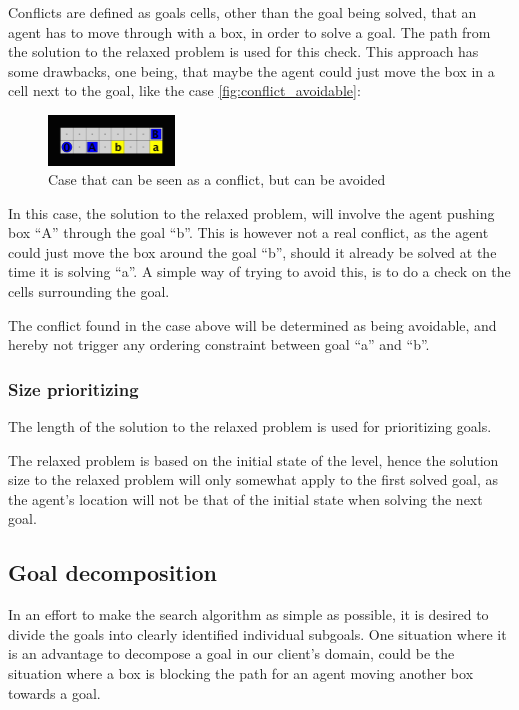 \documentclass[Main]{subfiles}
\begin{document}
Conflicts are defined as goals cells, other than the goal being solved, that an
agent has to move through with a box, in order to solve a goal. The path from
the solution to the relaxed problem is used for this check. This approach has
some drawbacks, one being, that maybe the agent could just move the box in a
cell next to the goal, like the case \autoref{fig:conflict_avoidable}:

\begin{figure}[h!]
  \centering
  \includegraphics[width=0.3\textwidth]{conflict.png}
  \caption{Case that can be seen as a conflict, but can be avoided}
  \label{fig:conflict_avoidable}
\end{figure}

In this case, the solution to the relaxed problem, will involve the agent
pushing box ``A'' through the goal ``b''. This is however not a real conflict,
as the agent could just move the box around the goal ``b'', should it already be
solved at the time it is solving ``a''. A simple way of trying to avoid this, is
to do a check on the cells surrounding the goal. 

The conflict found in the case above will be determined as being avoidable, and
hereby not trigger any ordering constraint between goal ``a'' and ``b''. 

\subsubsection{Size prioritizing} 
The length of the solution to the relaxed problem is used for prioritizing
goals. 

The relaxed problem is based on the initial state of the level, hence the
solution size to the relaxed problem will only somewhat apply to the first
solved goal, as the agent's location will not be that of the initial state when
solving the next goal. 

\subsection{Goal decomposition}
In an effort to make the search algorithm as simple as possible, it is desired
to divide the goals into clearly identified individual subgoals. 
One situation where it is an advantage to decompose a goal in our client's
domain, could be the situation where a box is blocking the path for an agent
moving another box towards a goal. 
\end{document}
